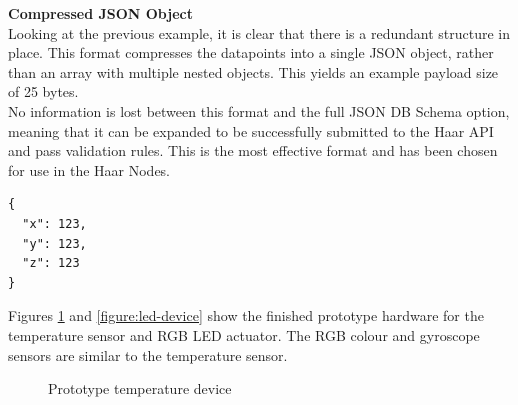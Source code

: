     \noindent
    \begin{minipage}[t]{0.45\textwidth}
      \textbf{Compressed JSON Object}\\
      Looking at the previous example, it is clear that there is a redundant structure in place. This format compresses the datapoints into a single JSON object, rather than an array with multiple nested objects. This yields an example payload size of 25 bytes.\\

      No information is lost between this format and the full JSON DB Schema option, meaning that it can be expanded to be successfully submitted to the Haar API and pass validation rules. This is the most effective format and has been chosen for use in the Haar Nodes. 
    \end{minipage}
    \hfill
    \begin{minipage}[t]{0.45\textwidth}
      \begin{lstlisting}[frame=single]
{
  "x": 123,
  "y": 123,
  "z": 123
}
      \end{lstlisting}
    \end{minipage}

    Figures \ref{figure:temp-device} and \ref{figure:led-device} show the finished prototype hardware for the temperature sensor and RGB LED actuator. The RGB colour and gyroscope sensors are similar to the temperature sensor. 

    \begin{figure}
      \centering
      \caption{Prototype temperature device}\label{figure:temp-device}
    \end{figure}

